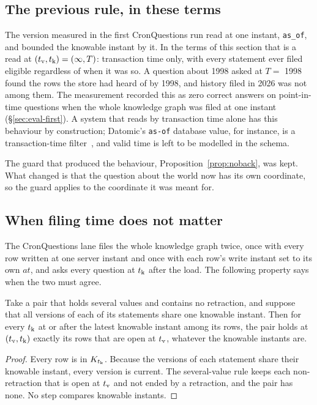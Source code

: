 \subsection{The previous rule, in these terms}

The version measured in the first CronQuestions run read at one instant,
\texttt{as\_of}, and bounded the knowable instant by it. In the terms of this
section that is a read at $(t_{\mathrm{v}}, t_{\mathrm{k}}) = (\infty, T)$: transaction time only,
with every statement ever filed eligible regardless of when it was so. A
question about 1998 asked at $T = $ 1998 found the rows the store had heard of
by 1998, and history filed in 2026 was not among them. The measurement recorded
this as zero correct answers on point-in-time questions when the whole
knowledge graph was filed at one instant (\S\ref{sec:eval-first}). A system that
reads by transaction time alone has this behaviour by construction; Datomic's
\texttt{as-of} database value, for instance, is a transaction-time
filter~\cite{datomic}, and valid time is left to be modelled in the schema.

The guard that produced the behaviour, Proposition~\ref{prop:noback}, was kept.
What changed is that the question about the world now has its own coordinate,
so the guard applies to the coordinate it was meant for.

\subsection{When filing time does not matter}

The CronQuestions lane files the whole knowledge graph twice, once with every
row written at one server instant and once with each row's write instant set to
its own $\mathit{at}$, and asks every question at $t_{\mathrm{k}}$ after the load. The
following property says when the two must agree.

\begin{proposition}
\label{prop:filing}
Take a pair that holds several values and contains no retraction, and suppose
that all versions of each of its statements share one knowable instant. Then for
every $t_{\mathrm{k}}$ at or after the latest knowable instant among its rows, the pair
holds at $(t_{\mathrm{v}}, t_{\mathrm{k}})$ exactly its rows that are open at $t_{\mathrm{v}}$, whatever the
knowable instants are.
\end{proposition}
\begin{proof}
Every row is in $K_{t_{\mathrm{k}}}$. Because the versions of each statement share their
knowable instant, every version is current. The several-value rule keeps each
non-retraction that is open at $t_{\mathrm{v}}$ and not ended by a retraction, and the pair
has none. No step compares knowable instants.
\end{proof}

